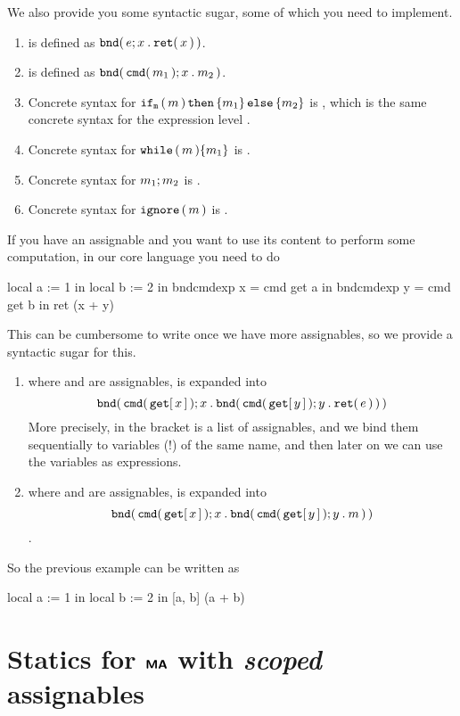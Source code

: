 \documentclass[11pt]{article}
\begin{document}
We also provide you some syntactic sugar, some of which you need to implement.
\begin{enumerate}
  \item {} is defined as ${\mathtt{bnd}}\mathtt{(}\,e;{x}\mathbin{\mathtt{.}}{{\mathtt{ret}}\mathtt{(}\,x\,\mathtt{)}}\,\mathtt{)}$.
  \item {} is defined as ${\mathtt{bnd}}\mathtt{(}\,{\mathtt{cmd}}\mathtt{(}\,m_1\,\mathtt{)};{x}\mathbin{\mathtt{.}}{m_2}\,\mathtt{)}$.
  \item Concrete syntax for $\mathtt{if}_{\mathtt{m}}\,\mathtt{(}\,m\,\mathtt{)}\,\mathtt{then}\,\mathtt{\{}{m_1}\mathtt{\}}\,\mathtt{else}\,\mathtt{\{}{m_2}\mathtt{\}}$ is , which
  is the same concrete syntax for the expression level .
  \item Concrete syntax for $\mathtt{while}\,\mathtt{(}\,m\,\mathtt{)}\mathtt{\{}{m_1}\mathtt{\}}$ is .
  \item Concrete syntax for ${m_1};{m_2}$ is .
  \item Concrete syntax for $\mathtt{ignore}\,\mathtt{(}\,m\,\mathtt{)}$ is .
\end{enumerate}

If you have an assignable and you want to use its content to perform some computation, in our core language you need to do
\begin{codeblock}
  local a := 1 in
  local b := 2 in {
    bndcmdexp x = cmd { get a } in
      bndcmdexp y = cmd { get b } in
        ret (x + y)
  }
\end{codeblock}
This can be cumbersome to write once we have more assignables, so we provide a syntactic sugar for this.
\begin{enumerate}
  \item {} where  and  are assignables, is expanded into
  $${\mathtt{bnd}}\mathtt{(}\,{\mathtt{cmd}}\mathtt{(}\,{\mathtt{get}}\mathtt{[}\,{x}\,\mathtt{]}\,\mathtt{)};{x}\mathbin{\mathtt{.}}{{\mathtt{bnd}}\mathtt{(}\,{\mathtt{cmd}}\mathtt{(}\,{\mathtt{get}}\mathtt{[}\,{y}\,\mathtt{]}\,\mathtt{)};{y}\mathbin{\mathtt{.}}{{\mathtt{ret}}\mathtt{(}\,e\,\mathtt{)}}\,\mathtt{)}}\,\mathtt{)}$$
  More precisely, in the bracket is a list of assignables, and we bind them sequentially to variables (!) of the same name,
  and then later on we can use the variables as expressions.

  \item {} where  and  are assignables, is expanded into
  $${\mathtt{bnd}}\mathtt{(}\,{\mathtt{cmd}}\mathtt{(}\,{\mathtt{get}}\mathtt{[}\,{x}\,\mathtt{]}\,\mathtt{)};{x}\mathbin{\mathtt{.}}{{\mathtt{bnd}}\mathtt{(}\,{\mathtt{cmd}}\mathtt{(}\,{\mathtt{get}}\mathtt{[}\,{y}\,\mathtt{]}\,\mathtt{)};{y}\mathbin{\mathtt{.}}{m}\,\mathtt{)}}\,\mathtt{)}$$.
\end{enumerate}

So the previous example can be written as
\begin{codeblock}
  local a := 1 in
  local b := 2 in
    [a, b] (a + b)
\end{codeblock}

\section{Statics for $\textbf{\textsf{MA}}{}$ with \emph{scoped} assignables}
\end{document}
